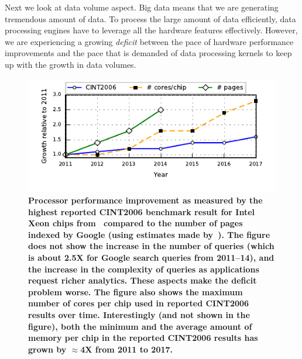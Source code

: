 Next we look at data volume aspect.
Big data means that we are generating tremendous amount of data.
To process the large amount of data efficiently, data processing engines have to leverage all the hardware features effectively. 
However, we are experiencing a growing \textit{deficit} between the pace of hardware performance improvements and the pace that is demanded of data processing kernels to keep up with the growth in data volumes.

\begin{figure}
	\centering
	\includegraphics[width=\columnwidth]{system/figures/deficit.pdf}
	\caption{\textbf{Processor performance improvement as measured by the highest reported CINT2006 benchmark result for Intel Xeon chips from~\cite{cpu2006} compared to the number of pages indexed by Google (using estimates made by~\cite{google-pages-db}). The figure does not show the increase in the number of queries (which is about 2.5X for Google search queries from 2011--14), and the increase in the complexity of queries as applications request richer analytics. These aspects make the deficit problem worse. The figure also shows the maximum number of cores per chip used in reported CINT2006 results over time. Interestingly (and not shown in the figure), both the minimum and the average amount of memory per chip in the reported CINT2006 results has grown by $\approx$4X from 2011 to 2017.}}
	\label{fig-deficit}
\end{figure}

